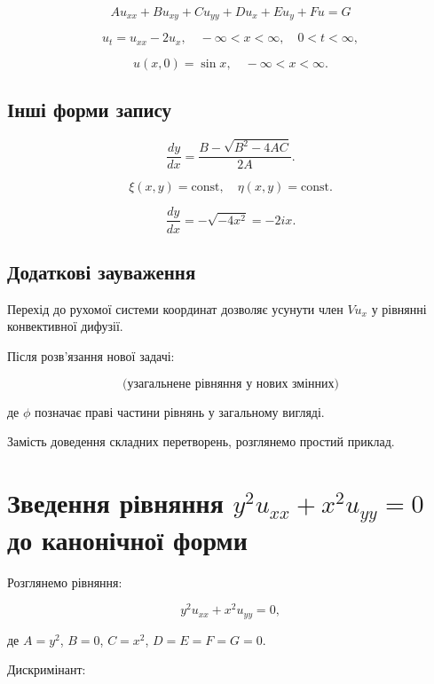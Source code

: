 \documentclass[
  ukrainian,
]{article}
\begin{document}
\[
A u_{xx} + B u_{xy} + C u_{yy} + D u_x + E u_y + F u = G
\]

\[
u_t = u_{xx} - 2u_x, \quad -\infty < x < \infty, \quad 0 < t < \infty,
\]

\[
u(x, 0) = \sin x, \quad -\infty < x < \infty.
\]

\subsection{Інші форми
запису}\label{ux456ux43dux448ux456-ux444ux43eux440ux43cux438-ux437ux430ux43fux438ux441ux443}

\[
\frac{dy}{dx} = \frac{B - \sqrt{B^2 - 4AC}}{2A}.
\]

\[
\xi(x, y) = \text{const}, \quad \eta(x, y) = \text{const}.
\]

\[
\frac{dy}{dx} = -\sqrt{-4x^2} = -2ix.
\]

\subsection{Додаткові
зауваження}\label{ux434ux43eux434ux430ux442ux43aux43eux432ux456-ux437ux430ux443ux432ux430ux436ux435ux43dux43dux44f}

Перехід до рухомої системи координат дозволяє усунути член \(V u_x\) у
рівнянні конвективної дифузії.

Після розв'язання нової задачі:

\[
\text{(узагальнене рівняння у нових змінних)}
\]

де \(\phi\) позначає праві частини рівнянь у загальному вигляді.

Замість доведення складних перетворень, розглянемо простий приклад.

\section{\texorpdfstring{Зведення рівняння
\(y^2 u_{xx} + x^2 u_{yy} = 0\) до канонічної
форми}{Зведення рівняння y\^{}2 u\_\{xx\} + x\^{}2 u\_\{yy\} = 0 до канонічної форми}}\label{ux437ux432ux435ux434ux435ux43dux43dux44f-ux440ux456ux432ux43dux44fux43dux43dux44f-y2-u_xx-x2-u_yy-0-ux434ux43e-ux43aux430ux43dux43eux43dux456ux447ux43dux43eux457-ux444ux43eux440ux43cux438}

Розглянемо рівняння:

\[
y^2 u_{xx} + x^2 u_{yy} = 0,
\]

де \(A = y^2\), \(B = 0\), \(C = x^2\), \(D = E = F = G = 0\).

Дискримінант:
\end{document}
